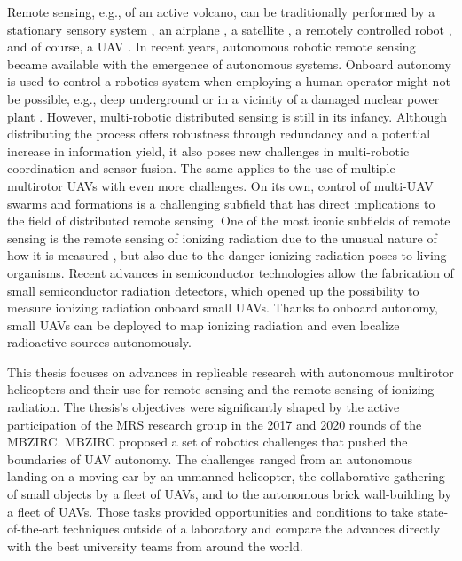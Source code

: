 \documentclass[a4paper,11pt,twoside,openright]{book}
\begin{document}
Remote sensing, e.g., of an active volcano, can be traditionally performed by a stationary sensory system \cite{ditraglia2018effusive}, an airplane \cite{walter2020eruption}, a satellite \cite{ganci2020variety}, a remotely controlled robot \cite{parcheta2016robotic}, and of course, a \ac{UAV} \cite{nagatani2018micro, ericksen2020locus}.
In recent years, autonomous robotic remote sensing became available with the emergence of autonomous systems.
Onboard autonomy is used to control a robotics system when employing a human operator might not be possible, e.g., deep underground \cite{apachristos2019autonomous, losch2018design} or in a vicinity of a damaged nuclear power plant \cite{sato2019radiation}.
However, multi-robotic distributed sensing is still in its infancy.
Although distributing the process offers robustness through redundancy and a potential increase in information yield, it also poses new challenges in multi-robotic coordination and sensor fusion.
The same applies to the use of multiple multirotor \acp{UAV} with even more challenges.
On its own, control of multi-\ac{UAV} swarms and formations is a challenging subfield that has direct implications to the field of distributed remote sensing.
One of the most iconic subfields of remote sensing is the remote sensing of ionizing radiation due to the unusual nature of how it is measured \cite{andreo2017fundamentals}, but also due to the danger ionizing radiation poses to living organisms.
Recent advances in semiconductor technologies allow the fabrication of small semiconductor radiation detectors, which opened up the possibility to measure ionizing radiation onboard small \acp{UAV}.
Thanks to onboard autonomy, small \acp{UAV} can be deployed to map ionizing radiation and even localize radioactive sources autonomously.

This thesis focuses on advances in replicable research with autonomous multirotor helicopters and their use for remote sensing and the remote sensing of ionizing radiation.
The thesis's objectives were significantly shaped by the active participation of the \ac{MRS} research group in the 2017 and 2020 rounds of the \ac{MBZIRC}.
MBZIRC proposed a set of robotics challenges that pushed the boundaries of \ac{UAV} autonomy.
The challenges ranged from an autonomous landing on a moving car by an unmanned helicopter, the collaborative gathering of small objects by a fleet of \acp{UAV}, and to the autonomous brick wall-building by a fleet of \acp{UAV}.
Those tasks provided opportunities and conditions to take state-of-the-art techniques outside of a laboratory and compare the advances directly with the best university teams from around the world.
\end{document}

